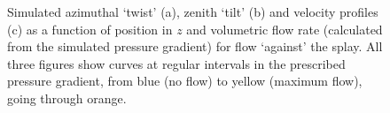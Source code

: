 \begin{figure}
\begin{center}
\end{center}
\caption[Simulated twist, tilt and velocity profiles for flow `against' the splay]{\label{fig:splayed_against_twist_tilt_profile}Simulated azimuthal `twist' (a), zenith `tilt' (b) and velocity profiles (c) as a function of position in $z$ and volumetric flow rate (calculated from the simulated pressure gradient) for flow `against' the splay. All three figures show curves at regular intervals in the prescribed pressure gradient, from blue (no flow) to yellow (maximum flow), going through orange.}
\end{figure}

